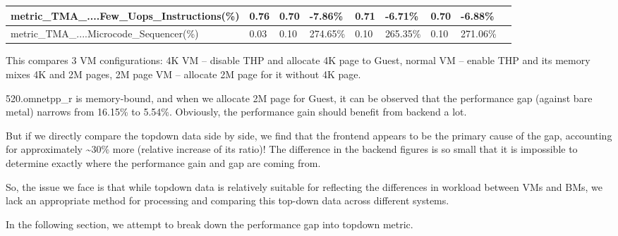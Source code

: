 \documentclass[12pt]{article}
\newcommand{\npar}[1]{#1\par}
\newcommand{\ipar}[2]{{\leftskip=#1\relax #2\par}}
\newcommand{\emptypar}{\mbox{}\par}
\begin{document}
\begin{longtable}{|m{139.55pt}|m{40.35pt}|m{36.25pt}|m{36.25pt}|m{36.25pt}|m{42.10pt}|m{30.30pt}|m{44.65pt}|@{}m{0pt}@{}}
\raggedright\arraybackslash{}metric\_\allowbreak{}TMA\_\allowbreak{}....Few\_\allowbreak{}Uops\_\allowbreak{}Instructions(\%) & \centering\arraybackslash{}0.76 & \centering\arraybackslash{}0.70 & \cellcolor[HTML]{D9D9D9}\centering\arraybackslash{}-7.86\% & \centering\arraybackslash{}0.71 & \cellcolor[HTML]{D9D9D9}\centering\arraybackslash{}-6.71\% & \centering\arraybackslash{}0.70 & \cellcolor[HTML]{D9D9D9}\centering\arraybackslash{}-6.88\% & \rule[-0.00pt]{0pt}{14.40pt} \\ \hline
\raggedright\arraybackslash{}metric\_\allowbreak{}TMA\_\allowbreak{}....Microcode\_\allowbreak{}Sequencer(\%) & \centering\arraybackslash{}0.03 & \centering\arraybackslash{}0.10 & \cellcolor[HTML]{D9D9D9}\centering\arraybackslash{}274.65\% & \centering\arraybackslash{}0.10 & \cellcolor[HTML]{D9D9D9}\centering\arraybackslash{}265.35\% & \centering\arraybackslash{}0.10 & \cellcolor[HTML]{D9D9D9}\centering\arraybackslash{}271.06\% & \rule[-0.00pt]{0pt}{14.40pt} \\ \hline
\end{longtable}
\endgroup\par
\emptypar
\ipar{18.00pt}{\hspace*{4\fontdimen2\font}This compares 3 VM configurations: 4K VM – disable THP and allocate 4K page to Guest, normal VM – enable THP and its memory mixes 4K and 2M pages, 2M page VM – allocate 2M page for it without 4K page.}
\ipar{18.00pt}{\hspace*{4\fontdimen2\font}520.omnetpp\_r is memory-bound, and when we allocate 2M page for Guest, it can be observed that the performance gap (against bare metal) narrows from 16.15\% to 5.54\%. Obviously, the performance gain should benefit from backend a lot.}
\ipar{18.00pt}{\hspace*{4\fontdimen2\font}But if we directly compare the topdown data side by side, we find that the frontend appears to be the primary cause of the gap, accounting for approximately \textasciitilde{}30\% more (relative increase of its ratio)! The difference in the backend figures is so small that it is impossible to determine exactly where the performance gain and gap are coming from.}
\emptypar
\npar{\hspace*{4\fontdimen2\font}So, the issue we face is that while topdown data is relatively suitable for reflecting the differences in workload between VMs and BMs, we lack an appropriate method for processing and comparing this top-down data across different systems. }
\npar{\hspace*{4\fontdimen2\font}In the following section, we attempt to break down the performance gap into topdown metric.}
\end{document}
